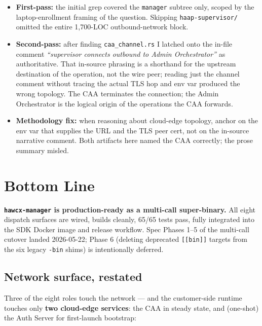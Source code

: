 \documentclass[11pt, a4paper]{article}
\newcommand{\code}[1]{\texttt{\small #1}}
\begin{document}
\begin{itemize}
  \item \textbf{First-pass:} the initial grep covered the \code{manager}
        subtree only, scoped by the laptop-enrollment framing of the
        question. Skipping \code{haap-supervisor/} omitted the entire
        1,700-LOC outbound-network block.
  \item \textbf{Second-pass:} after finding \code{caa\_channel.rs} I
        latched onto the in-file comment \emph{``supervisor connects
        outbound to Admin Orchestrator''} as authoritative. That
        in-source phrasing is a shorthand for the upstream destination
        of the operation, not the wire peer; reading just the channel
        comment without tracing the actual TLS hop and env var produced
        the wrong topology. The CAA terminates the connection; the
        Admin Orchestrator is the logical origin of the operations the
        CAA forwards.
  \item \textbf{Methodology fix:} when reasoning about cloud-edge
        topology, anchor on the env var that supplies the URL and the
        TLS peer cert, not on the in-source narrative comment. Both
        artifacts here named the CAA correctly; the prose summary
        misled.
\end{itemize}

\section{Bottom Line}

\begin{okbox}
\textbf{\code{hawcx-manager} is production-ready as a multi-call
super-binary.} All eight dispatch surfaces are wired, builds cleanly,
65/65 tests pass, fully integrated into the SDK Docker image and
release workflow. Spec Phases 1--5 of the multi-call cutover landed
2026-05-22; Phase 6 (deleting deprecated \code{[[bin]]} targets from the
six legacy \code{*-bin} shims) is intentionally deferred.
\end{okbox}

\subsection{Network surface, restated}

Three of the eight roles touch the network --- and the customer-side
runtime touches only \textbf{two cloud-edge services}: the CAA in
steady state, and (one-shot) the Auth Server for first-launch bootstrap:
\end{document}
